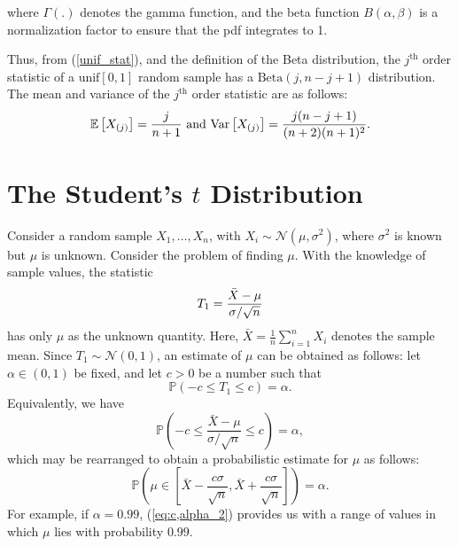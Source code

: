 \documentclass[a4paper,english,12pt]{article}
\begin{document}
\begin{exmp}
\begin{defn}
    	where $ \Gamma(.) $ denotes the gamma function, and the beta function $B(\alpha,\beta)$ is a normalization factor to ensure that the pdf integrates to 1.
    \end{defn}    
    Thus, from (\ref*{unif_stat}), and the definition of the Beta distribution, the $j^{\text{th}}$ order statistic of a $ \text{unif}\left[0,1\right] $ random sample has a $ \text{Beta}(j,n-j+1 ) $ distribution. The mean and variance of the $ j^{\text{th}} $ order statistic are as follows:
    \begin{equation}
     \mathbb{E} \left[X_{\left(j\right)}\right] = \frac{j}{n+1} ~ \text{and} ~
     \text{Var} \left[X_{\left(j\right)}\right] = \frac{j(n-j+1)}{(n+2)(n+1)^{2}}. \nonumber
    \end{equation}
\end{exmp}
\section{The Student's $ t $ Distribution}
Consider a random sample $ X_{1},\ldots,X_{n} $, with $ X_{i}\sim\mathcal{N}(\mu,\sigma^{2}) $, where $ \sigma^{2} $ is known but $ \mu $ is unknown. Consider the problem of finding $ \mu $. With the knowledge of sample values, the statistic 
\begin{equation}
T_{1}=\frac{\bar{X}-\mu}{\sigma/\sqrt{n}} \label{T_{1}}
\end{equation}
has only $ \mu $ as the unknown quantity. Here, $ \bar{X}=\frac{1}{n}\sum\limits_{i=1}^{n}X_{i} $ denotes the sample mean. Since $ T_{1} \sim \mathcal{N}(0,1) $, an estimate of $ \mu $ can be obtained as follows: let $ \alpha \in (0,1) $ be fixed, and let $ c>0 $ be a number such that
\begin{equation}
\mathbb{P}\left(-c  \leq T_{1} \leq c \right)=\alpha. \label{eq:c,alpha}
\end{equation}
Equivalently, we have
\begin{equation}
\mathbb{P}\left(-c \leq \frac{\bar{X}-\mu}{{\sigma}/\sqrt{n}} \leq c \right)=\alpha, \label{eq:c,alpha_1}
\end{equation}
which may be rearranged to obtain a probabilistic estimate for $ \mu $ as follows:
\begin{equation}
\mathbb{P}\left(\mu \in \left[\bar{X}-\frac{c\sigma}{\sqrt{n}}, \bar{X}+\frac{c\sigma}{\sqrt{n}}\right] \right)=\alpha. \label{eq:c,alpha_2}
\end{equation}
For example, if $ \alpha=0.99 $,  (\ref*{eq:c,alpha_2}) provides us with a range of values in which $ \mu $ lies with probability $ 0.99 $.
\end{document}
